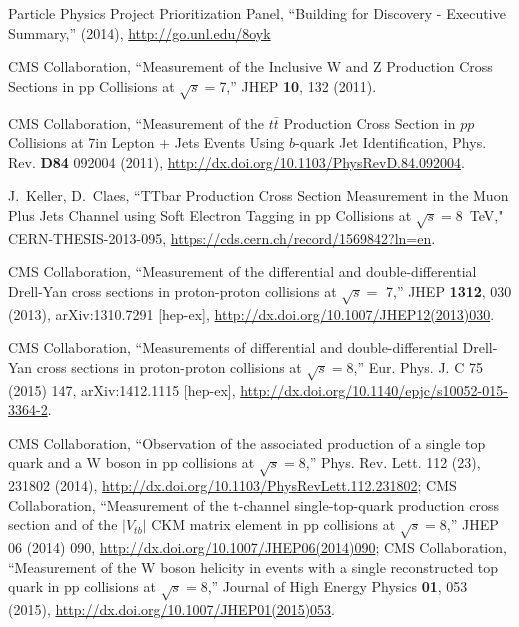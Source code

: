 \begin{thebibliography}{99}





%
%
Particle Physics Project Prioritization Panel, ``Building for Discovery - Executive Summary,'' (2014), \url{http://go.unl.edu/8oyk}

 CMS Collaboration, ``Measurement of the Inclusive W and Z Production 
     Cross Sections in pp Collisions at $\sqrt{s} =$7\TeV,''
     JHEP {\bf 10}, 132 (2011).
     
 CMS Collaboration, ``Measurement of the $t\bar{t}$
  Production Cross Section in $pp$ Collisions at 7\TeV in Lepton + Jets
  Events Using $b$-quark Jet Identification, Phys. Rev. {\bf D84} 092004
  (2011), \url{http://dx.doi.org/10.1103/PhysRevD.84.092004}.

  J.~Keller, D.~Claes, ``TTbar Production Cross Section Measurement in the Muon Plus Jets Channel using Soft Electron Tagging in pp Collisions at $\sqrt{s}=$8~TeV," CERN-THESIS-2013-095, \url{https://cds.cern.ch/record/1569842?ln=en}.

CMS Collaboration, ``Measurement of the differential and double-differential Drell-Yan cross sections in proton-proton collisions at $\sqrt{s} =$ 7\TeV,''
JHEP {\bf 1312}, 030 (2013), %
arXiv:1310.7291 [hep-ex],
\url{http://dx.doi.org/10.1007/JHEP12(2013)030}.

CMS Collaboration, ``Measurements of differential and double-differential Drell-Yan cross sections in proton-proton collisions at $\sqrt{s}=$8\TeV,'' 
Eur. Phys. J. C 75 (2015) 147, arXiv:1412.1115 [hep-ex], \url{http://dx.doi.org/10.1140/epjc/s10052-015-3364-2}.

%
CMS Collaboration, ``Observation of the associated production of a single top quark and a W boson in pp collisions at $\sqrt{s}=$8\TeV,'' Phys. Rev. Lett. 112 (23), 231802 (2014), \url{http://dx.doi.org/10.1103/PhysRevLett.112.231802};
%
CMS Collaboration, ``Measurement of the t-channel single-top-quark production cross section and of the $|V_{tb}|$ CKM matrix element in pp collisions at $\sqrt{s} = 8$\TeV,'' JHEP 06 (2014) 090, \url{http://dx.doi.org/10.1007/JHEP06(2014)090};
%
CMS Collaboration, ``Measurement of the W boson helicity in events with a single reconstructed top quark in pp collisions at $\sqrt{s}=$8\TeV,''  Journal of High Energy Physics {\bf 01},  053 (2015), \url{http://dx.doi.org/10.1007/JHEP01(2015)053}.


\end{thebibliography}
